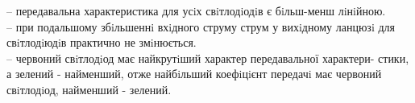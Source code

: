 \documentclass[a4paper,14pt]{extreport}
\begin{document}
-- передавальна характеристика для усiх свiтлодiодiв є бiльш-менш лiнiйною.\\ 

-- при подальшому збiльшеннi вхiдного струму струм у вихiдному ланцюзi для
свiтлодiюдiв практично не змiнюється.\\ 

-- червоний свiтлодiод має найкрутiший характер передавальної характери-
стики, а зелений - найменший, отже найбiльший коефiцiєнт передачi має
червоний свiтлодiод, найменший - зелений.
\begin{figure}[h!]
\end{figure}
\end{document}
